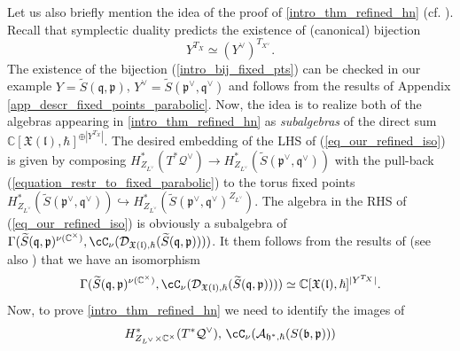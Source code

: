 \documentclass[12pt]{amsart}
\begin{document}
Let us also briefly mention the idea of the proof of \cref{intro_thm_refined_hn} (cf. \cite{ksh}). Recall that symplectic duality predicts the existence of (canonical) bijection 
\begin{equation}\label{intro_bij_fixed_pts}
Y^{T_X} \simeq (Y^{\vee})^{T_{X^\vee}}.
\end{equation}
The existence of the  bijection (\ref{intro_bij_fixed_pts}) can be checked in our example $Y=\widetilde{S}(\mathfrak{q},\mathfrak{p})$, $Y^\vee=\widetilde{S}(\mathfrak{p}^\vee,\mathfrak{q}^\vee)$ and follows from the results of Appendix \ref{app_descr_fixed_points_parabolic}. Now, the idea is to realize both of the algebras appearing in \cref{intro_thm_refined_hn} as {\emph{subalgebras}} of the direct sum $\mathbb{C}[\mathfrak{X}(\mathfrak{l}),\hbar]^{\oplus |Y^{T_X}|}$. The desired embedding of the LHS of (\ref{eq_our_refined_iso}) is given by composing $H^*_{Z_{L^\vee}}(T^*\mathcal{Q}^\vee) 
    \rightarrow H^*_{Z_{L^\vee}}(\widetilde{S}(\mathfrak{p}^\vee,\mathfrak{q}^\vee))$
with the pull-back (\ref{equation_restr_to_fixed_parabolic}) to the torus fixed points  $ H^*_{Z_{L^\vee}}(\widetilde{S}(\mathfrak{p}^\vee,\mathfrak{q}^\vee)) \hookrightarrow H^*_{Z_{L^\vee}}(\widetilde{S}(\mathfrak{p}^\vee,\mathfrak{q}^\vee)^{Z_{L^\vee}})$. The algebra in the RHS of (\ref{eq_our_refined_iso}) is obviously a subalgebra of $\Gamma(\widetilde{S}(\mathfrak{q},\mathfrak{p})^{\nu(\mathbb{C}^\times)},\cC_\nu(\mathcal{D}_{\mathfrak{X}(\mathfrak{l}),\hbar}(\widetilde{S}(\mathfrak{q},\mathfrak{p}))))$. It them follows from the results of \cite[Section 5]{BPWII} (see also \cite[Section 5.2]{LosevCatO}) that we have an isomorphism 
\begin{equation*}
\Gamma(\widetilde{S}(\mathfrak{q},\mathfrak{p})^{\nu(\mathbb{C}^\times)},\cC_\nu(\mathcal{D}_{\mathfrak{X}(\mathfrak{l}),\hbar}(\widetilde{S}(\mathfrak{q},\mathfrak{p})))) \simeq \mathbb{C}[\mathfrak{X}(\mathfrak{l}),\hbar]^{|Y^{T_X}|}.
\end{equation*}
Now, to prove \cref{intro_thm_refined_hn} we need to identify the images of 
\begin{equation}\label{eq_alg_targets}
H^*_{Z_{L^\vee} \times \mathbb{C}^\times}(T^*\mathcal{Q}^\vee),\,\cC_\nu(\mathcal{A}_{\mathfrak{h}^*,\hbar}(S(\mathfrak{b},\mathfrak{p})))
\end{equation}
\end{document}
